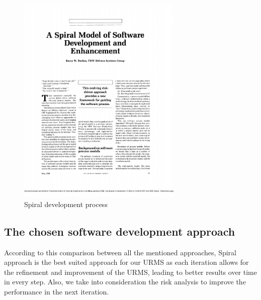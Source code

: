 \documentclass[conference,onecolumn]{IEEEtran}
\begin{document}
\begin{figure}[htb]
	\centering
	\includegraphics[width=0.7\textwidth, clip, page=4, trim=3cm 10cm 3cm 3cm]{Figures/paper_models.pdf}
	\caption{Spiral development process \cite[p.64]{a6}}
	\label{fig:spiral}
\end{figure}

\subsection{The chosen software development approach}

According to this comparison between all the mentioned approaches, Spiral approach is the best suited approach for our URMS as each iteration allows for the refinement and improvement of the URMS, leading to better results over time in every step. Also, we take into consideration the risk analysis to improve the performance in the next iteration.

\end{document}
